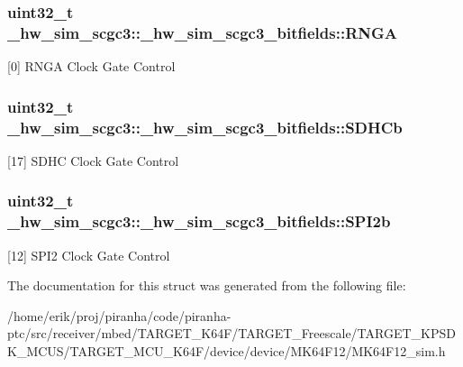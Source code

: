 \subsubsection[{\texorpdfstring{R\+N\+GA}{RNGA}}]{\setlength{\rightskip}{0pt plus 5cm}uint32\+\_\+t \+\_\+hw\+\_\+sim\+\_\+scgc3\+::\+\_\+hw\+\_\+sim\+\_\+scgc3\+\_\+bitfields\+::\+R\+N\+GA}\hypertarget{struct__hw__sim__scgc3_1_1__hw__sim__scgc3__bitfields_a77c37f1e90d82eb33dc7709a9fcf0a0c}{}\label{struct__hw__sim__scgc3_1_1__hw__sim__scgc3__bitfields_a77c37f1e90d82eb33dc7709a9fcf0a0c}
\mbox{[}0\mbox{]} R\+N\+GA Clock Gate Control 
\subsubsection[{\texorpdfstring{S\+D\+H\+Cb}{SDHCb}}]{\setlength{\rightskip}{0pt plus 5cm}uint32\+\_\+t \+\_\+hw\+\_\+sim\+\_\+scgc3\+::\+\_\+hw\+\_\+sim\+\_\+scgc3\+\_\+bitfields\+::\+S\+D\+H\+Cb}\hypertarget{struct__hw__sim__scgc3_1_1__hw__sim__scgc3__bitfields_a11925c8d2f766906cd379eee019dca70}{}\label{struct__hw__sim__scgc3_1_1__hw__sim__scgc3__bitfields_a11925c8d2f766906cd379eee019dca70}
\mbox{[}17\mbox{]} S\+D\+HC Clock Gate Control 
\subsubsection[{\texorpdfstring{S\+P\+I2b}{SPI2b}}]{\setlength{\rightskip}{0pt plus 5cm}uint32\+\_\+t \+\_\+hw\+\_\+sim\+\_\+scgc3\+::\+\_\+hw\+\_\+sim\+\_\+scgc3\+\_\+bitfields\+::\+S\+P\+I2b}\hypertarget{struct__hw__sim__scgc3_1_1__hw__sim__scgc3__bitfields_aa7529d4718e9bfe4efc8d9ebfdbd363d}{}\label{struct__hw__sim__scgc3_1_1__hw__sim__scgc3__bitfields_aa7529d4718e9bfe4efc8d9ebfdbd363d}
\mbox{[}12\mbox{]} S\+P\+I2 Clock Gate Control 

The documentation for this struct was generated from the following file\+:\begin{DoxyCompactItemize}
\item 
/home/erik/proj/piranha/code/piranha-\/ptc/src/receiver/mbed/\+T\+A\+R\+G\+E\+T\+\_\+\+K64\+F/\+T\+A\+R\+G\+E\+T\+\_\+\+Freescale/\+T\+A\+R\+G\+E\+T\+\_\+\+K\+P\+S\+D\+K\+\_\+\+M\+C\+U\+S/\+T\+A\+R\+G\+E\+T\+\_\+\+M\+C\+U\+\_\+\+K64\+F/device/device/\+M\+K64\+F12/M\+K64\+F12\+\_\+sim.\+h\end{DoxyCompactItemize}

